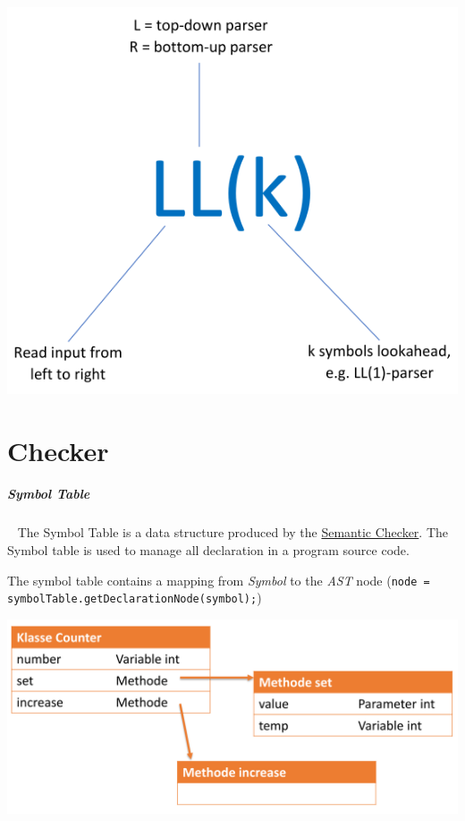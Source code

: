 \documentclass[12pt,twoside,landscape]{extarticle}
\begin{document}
\begin{multicols}{4}
{
\begin{center}
\includegraphics[width=.9\linewidth]{img/parser_notation.png}
\end{center}
\label{fig:parser-notation}
}

\section{Checker}
\label{sec:org8e99352}
\subparagraph{Symbol Table} \
\label{sec:orgc98b086}
The Symbol Table is a data structure produced by the \href{../../../roam/20221228115353-what_is_a_semantic_checker.org}{Semantic Checker}.
The Symbol table is used to manage all declaration in a program source code.

The symbol table contains a mapping from \emph{Symbol} to the \emph{AST} node (\texttt{node = symbolTable.getDeclarationNode(symbol);})


{
\begin{center}
\includegraphics[width=.9\linewidth]{img/symbol_table_example.png}
\end{center}
\label{fig:example-structure-for-a-symbol-table}
}

\end{multicols}
\end{document}

